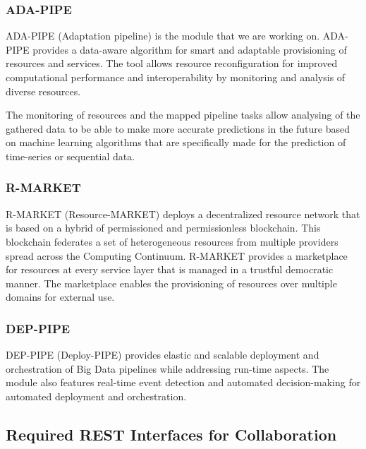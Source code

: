 \documentclass{article}
\begin{document}
            \subsubsection*{ADA-PIPE}
            \label{sec:adaptation-pipe-datacloud}

                ADA-PIPE (Adaptation pipeline) \cite{mehranADAPIPE2023} is the module that we are working on.
                ADA-PIPE provides a data-aware algorithm for smart and adaptable provisioning of resources and services. The tool allows resource reconfiguration for improved computational performance and interoperability by monitoring and analysis of diverse resources. 
                
                The monitoring of resources and the mapped pipeline tasks allow analysing of the gathered data to be able to make more accurate predictions in the future based on machine learning algorithms that are specifically made for the prediction of time-series or sequential data.

            \subsubsection*{R-MARKET}
            \label{sec:resource-market-datacloud}

                R-MARKET (Resource-MARKET) \cite{senguptaRMARKET} deploys a decentralized resource network that is based on a hybrid of permissioned and permissionless blockchain. This blockchain federates a set of heterogeneous resources from multiple providers spread across the Computing Continuum.
                R-MARKET provides a marketplace for resources at every service layer that is managed in a trustful democratic manner.
                The marketplace enables the provisioning of resources over multiple domains for external use.

            \subsubsection*{DEP-PIPE}
            \label{sec:deploy-pipe-datacloud}

                DEP-PIPE (Deploy-PIPE) \cite{ledakisDEPPIPE} provides elastic and scalable deployment and orchestration of Big Data pipelines while addressing run-time aspects.
                The module also features real-time event detection and automated decision-making for automated deployment and orchestration.

        \subsection{Required REST Interfaces for Collaboration}
        \label{sec:required-interfaces}
\end{document}
